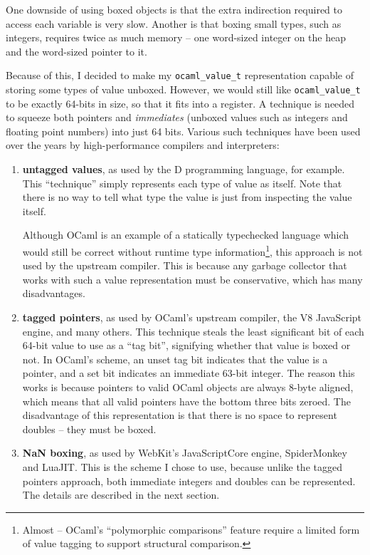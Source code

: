 \documentclass[12pt,a4paper,twoside,openright]{report}
\begin{document}
One downside of using boxed objects is that the extra indirection required to
access each variable is very slow. Another is that boxing small types, such as
integers, requires twice as much memory -- one word-sized integer on the heap
and the word-sized pointer to it.

Because of this, I decided to make my \lstinline!ocaml_value_t! representation
capable of storing some types of value unboxed. However, we would still like
\lstinline!ocaml_value_t! to be exactly 64-bits in size, so that it fits into a
register. A technique is needed to squeeze both pointers and \textit{immediates}
(unboxed values such as integers and floating point numbers) into just 64 bits.
Various such techniques have been used over the years by high-performance
compilers and interpreters:
\begin{enumerate}
  \item \textbf{untagged values}, as used by the D programming language, for
    example. This ``technique'' simply represents each type of value as itself.
    Note that there is no way to tell what type the value is just from inspecting the value itself.

    Although OCaml is an example of a statically typechecked language which would
    still be correct without runtime type information\footnote{Almost -- OCaml's
    ``polymorphic comparisons'' feature require a limited form of value tagging
    to support structural comparison.}, this approach is not used by the upstream
    compiler. This is because any garbage collector that works with such a
    value representation must be conservative, which has many
    disadvantages.
  \item \textbf{tagged pointers}, as used by OCaml's upstream compiler, the V8
    JavaScript engine, and many others. This technique steals the least
    significant bit of each 64-bit value to use as a ``tag bit'', signifying whether
    that value is boxed or not. In OCaml's scheme, an unset tag bit indicates
    that the value is a pointer, and a set bit indicates an immediate 63-bit integer.
    The reason this works is because pointers to valid OCaml objects are always
    8-byte aligned, which means that all valid pointers have the bottom
    three bits zeroed. The disadvantage of this representation is that there is
    no space to represent doubles -- they must be boxed.
  \item \textbf{NaN boxing}, as used by WebKit's JavaScriptCore engine,
    SpiderMonkey and LuaJIT. This is the scheme I chose to use, because unlike
    the tagged pointers approach, both immediate integers and doubles can be
    represented. The details are described in the next section.
\end{enumerate}
\end{document}
